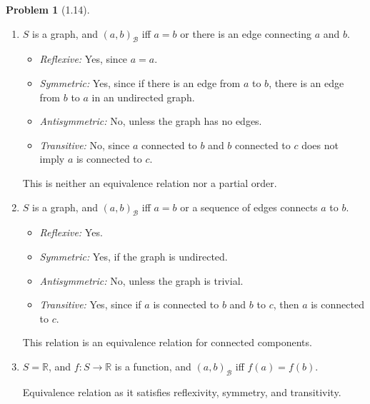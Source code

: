 \documentclass[12pt]{article}
\theoremstyle{definition}
\newtheorem{problem}{Problem}
\begin{document}
\begin{problem}[1.14]
\begin{enumerate}[label=(\alph*)]
        \item $S$ is a graph, and $(a, b)_\mathcal{B}$ iff $a = b$ or there is an edge connecting $a$ and $b$.
        \begin{solution}
            \begin{itemize}
                \item \textit{Reflexive:} Yes, since $a = a$.
                \item \textit{Symmetric:} Yes, since if there is an edge from $a$ to $b$, there is an edge from $b$ to $a$ in an undirected graph.
                \item \textit{Antisymmetric:} No, unless the graph has no edges.
                \item \textit{Transitive:} No, since $a$ connected to $b$ and $b$ connected to $c$ does not imply $a$ is connected to $c$.
            \end{itemize}
            This is neither an equivalence relation nor a partial order.
        \end{solution}
        
        \item $S$ is a graph, and $(a, b)_\mathcal{B}$ iff $a = b$ or a sequence of edges connects $a$ to $b$.
        \begin{solution}
            \begin{itemize}
                \item \textit{Reflexive:} Yes.
                \item \textit{Symmetric:} Yes, if the graph is undirected.
                \item \textit{Antisymmetric:} No, unless the graph is trivial.
                \item \textit{Transitive:} Yes, since if $a$ is connected to $b$ and $b$ to $c$, then $a$ is connected to $c$.
            \end{itemize}
            This relation is an equivalence relation for connected components.
        \end{solution}
        
        \item $S = \mathbb{R}$, and $f: S \rightarrow \mathbb{R}$ is a function, and $(a, b)_\mathcal{B}$ iff $f(a) = f(b)$.
        \begin{solution}

           Equivalence relation as it satisfies reflexivity, symmetry, and transitivity.
        \end{solution}
        

\end{enumerate}
\end{problem}
\end{document}
